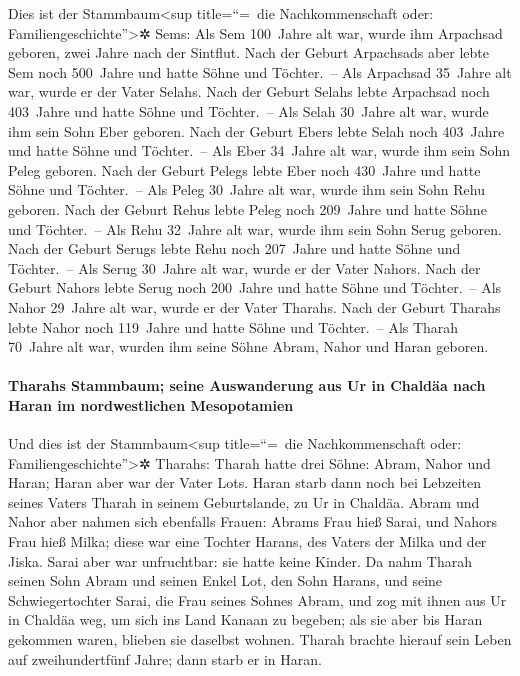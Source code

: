  Dies ist der Stammbaum\textless sup title=``=~die
Nachkommenschaft oder: Familiengeschichte''\textgreater✲ Sems: Als Sem
100~Jahre alt war, wurde ihm Arpachsad geboren, zwei Jahre nach der
Sintflut.  Nach der Geburt Arpachsads aber lebte Sem noch
500~Jahre und hatte Söhne und Töchter.~--  Als Arpachsad
35~Jahre alt war, wurde er der Vater Selahs.  Nach der
Geburt Selahs lebte Arpachsad noch 403~Jahre und hatte Söhne und
Töchter.~--  Als Selah 30~Jahre alt war, wurde ihm sein
Sohn Eber geboren.  Nach der Geburt Ebers lebte Selah
noch 403~Jahre und hatte Söhne und Töchter.~--  Als Eber
34~Jahre alt war, wurde ihm sein Sohn Peleg geboren. 
Nach der Geburt Pelegs lebte Eber noch 430~Jahre und hatte Söhne und
Töchter.~--  Als Peleg 30~Jahre alt war, wurde ihm sein
Sohn Rehu geboren.  Nach der Geburt Rehus lebte Peleg
noch 209~Jahre und hatte Söhne und Töchter.~--  Als Rehu
32~Jahre alt war, wurde ihm sein Sohn Serug geboren. 
Nach der Geburt Serugs lebte Rehu noch 207~Jahre und hatte Söhne und
Töchter.~--  Als Serug 30~Jahre alt war, wurde er der
Vater Nahors.  Nach der Geburt Nahors lebte Serug noch
200~Jahre und hatte Söhne und Töchter.~--  Als Nahor
29~Jahre alt war, wurde er der Vater Tharahs.  Nach der
Geburt Tharahs lebte Nahor noch 119~Jahre und hatte Söhne und
Töchter.~--  Als Tharah 70~Jahre alt war, wurden ihm
seine Söhne Abram, Nahor und Haran geboren.

\hypertarget{tharahs-stammbaum-seine-auswanderung-aus-ur-in-chalduxe4a-nach-haran-im-nordwestlichen-mesopotamien}{%
\paragraph{Tharahs Stammbaum; seine Auswanderung aus Ur in Chaldäa nach
Haran im nordwestlichen
Mesopotamien}\label{tharahs-stammbaum-seine-auswanderung-aus-ur-in-chalduxe4a-nach-haran-im-nordwestlichen-mesopotamien}}

 Und dies ist der Stammbaum\textless sup title=``=~die
Nachkommenschaft oder: Familiengeschichte''\textgreater✲ Tharahs: Tharah
hatte drei Söhne: Abram, Nahor und Haran; Haran aber war der Vater Lots.
 Haran starb dann noch bei Lebzeiten seines Vaters Tharah
in seinem Geburtslande, zu Ur in Chaldäa.  Abram und
Nahor aber nahmen sich ebenfalls Frauen: Abrams Frau hieß Sarai, und
Nahors Frau hieß Milka; diese war eine Tochter Harans, des Vaters der
Milka und der Jiska.  Sarai aber war unfruchtbar: sie
hatte keine Kinder.  Da nahm Tharah seinen Sohn Abram und
seinen Enkel Lot, den Sohn Harans, und seine Schwiegertochter Sarai, die
Frau seines Sohnes Abram, und zog mit ihnen aus Ur in Chaldäa weg, um
sich ins Land Kanaan zu begeben; als sie aber bis Haran gekommen waren,
blieben sie daselbst wohnen.  Tharah brachte hierauf sein
Leben auf zweihundertfünf Jahre; dann starb er in Haran.


